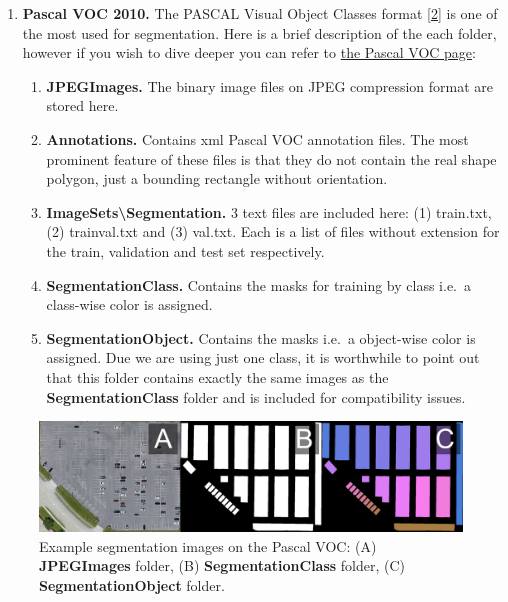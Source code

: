 \documentclass[]{article}
\providecommand{\tightlist}{%
  \setlength{\itemsep}{0pt}\setlength{\parskip}{0pt}}
\theoremstyle{definition}
\theoremstyle{definition}
\theoremstyle{definition}
\theoremstyle{remark}
\begin{document}
\begin{enumerate}
\def\labelenumi{\arabic{enumi}.}
\tightlist
\item
  \textbf{Pascal VOC 2010.} The PASCAL Visual Object Classes format
  {[}\protect\hyperlink{ref-Everingham10}{2}{]} is one of the most used
  for segmentation. Here is a brief description of the each folder,
  however if you wish to dive deeper you can refer to
  \href{http://host.robots.ox.ac.uk/pascal/VOC/}{the Pascal VOC page}:

  \begin{enumerate}
  \def\labelenumii{\arabic{enumii}.}
  \tightlist
  \item
    \textbf{JPEGImages.} The binary image files on JPEG compression
    format are stored here.
  \item
    \textbf{Annotations.} Contains xml Pascal VOC annotation files. The
    most prominent feature of these files is that they do not contain
    the real shape polygon, just a bounding rectangle without
    orientation.
  \item
    \textbf{ImageSets\textbackslash{}Segmentation.} 3 text files are
    included here: (1) train.txt, (2) trainval.txt and (3) val.txt. Each
    is a list of files without extension for the train, validation and
    test set respectively.
  \item
    \textbf{SegmentationClass.} Contains the masks for training by class
    i.e.~a class-wise color is assigned.
  \item
    \textbf{SegmentationObject.} Contains the masks i.e.~a object-wise
    color is assigned. Due we are using just one class, it is worthwhile
    to point out that this folder contains exactly the same images as
    the \textbf{SegmentationClass} folder and is included for
    compatibility issues.
  \end{enumerate}
\end{enumerate}

\begin{figure}

{\centering \includegraphics[width=0.45\linewidth]{images/apklot_examples/seg} 

}

\caption{Example segmentation images on the Pascal VOC: (A) \textbf{JPEGImages} folder, (B) \textbf{SegmentationClass} folder, (C) \textbf{SegmentationObject} folder. }\label{fig:fig1}
\end{figure}
\end{document}
